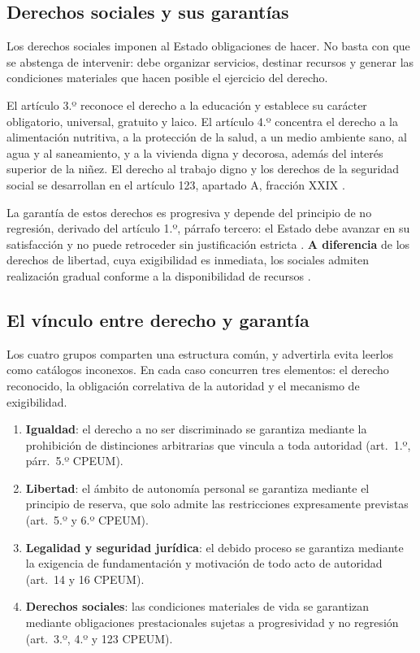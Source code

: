 \documentclass[
  spanish,
  letterpaper, oneside
]{article}
\begin{document}
\subsection{Derechos sociales y sus garantías}

Los derechos sociales imponen al Estado obligaciones de hacer. No basta con que se abstenga de intervenir: debe organizar servicios, destinar recursos y generar las condiciones materiales que hacen posible el ejercicio del derecho.

El artículo 3.º reconoce el derecho a la educación y establece su carácter obligatorio, universal, gratuito y laico. El artículo 4.º concentra el derecho a la alimentación nutritiva, a la protección de la salud, a un medio ambiente sano, al agua y al saneamiento, y a la vivienda digna y decorosa, además del interés superior de la niñez. El derecho al trabajo digno y los derechos de la seguridad social se desarrollan en el artículo 123, apartado A, fracción XXIX \citep{cpeum2026}.

La garantía de estos derechos es progresiva y depende del principio de no regresión, derivado del artículo 1.º, párrafo tercero: el Estado debe avanzar en su satisfacción y no puede retroceder sin justificación estricta \citep{cpeum2026}. \textbf{A diferencia} de los derechos de libertad, cuya exigibilidad es inmediata, los sociales admiten realización gradual conforme a la disponibilidad de recursos \citep{alvarezIcazaDerechosMexico}.

\subsection{El vínculo entre derecho y garantía}

Los cuatro grupos comparten una estructura común, y advertirla evita leerlos como catálogos inconexos. En cada caso concurren tres elementos: el derecho reconocido, la obligación correlativa de la autoridad y el mecanismo de exigibilidad.

\begin{enumerate}
  \item \textbf{Igualdad}: el derecho a no ser discriminado se garantiza mediante la prohibición de distinciones arbitrarias que vincula a toda autoridad (art.~1.º, párr.~5.º CPEUM).
  \item \textbf{Libertad}: el ámbito de autonomía personal se garantiza mediante el principio de reserva, que solo admite las restricciones expresamente previstas (art.~5.º y 6.º CPEUM).
  \item \textbf{Legalidad y seguridad jurídica}: el debido proceso se garantiza mediante la exigencia de fundamentación y motivación de todo acto de autoridad (art.~14 y 16 CPEUM).
  \item \textbf{Derechos sociales}: las condiciones materiales de vida se garantizan mediante obligaciones prestacionales sujetas a progresividad y no regresión (art.~3.º, 4.º y 123 CPEUM).
\end{enumerate}
\end{document}
